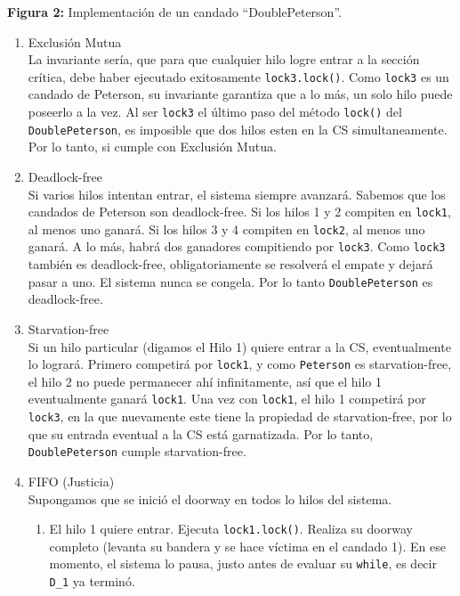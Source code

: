     \begin{center}
        \textbf{Figura 2:} Implementación de un candado ``DoublePeterson''.
    \end{center}
\begin{enumerate}
    \item Exclusión Mutua \\
    La invariante sería, que para que cualquier hilo logre entrar a la sección crítica, debe haber ejecutado exitosamente \texttt{lock3.lock()}. Como \texttt{lock3} es un candado de Peterson, su invariante garantiza que a lo más, un solo hilo puede poseerlo a la vez. Al ser \texttt{lock3} el último paso del método \texttt{lock()} del \texttt{DoublePeterson}, es imposible que dos hilos esten en la CS simultaneamente. Por lo tanto, si cumple con Exclusión Mutua.
    \item Deadlock-free \\
    Si varios hilos intentan entrar, el sistema siempre avanzará. Sabemos que los candados de Peterson son deadlock-free. Si los hilos 1 y 2 compiten en \texttt{lock1}, al menos uno ganará. Si los hilos 3 y 4 compiten en \texttt{lock2}, al menos uno ganará. A lo más, habrá dos ganadores compitiendo por \texttt{lock3}. Como \texttt{lock3} también es deadlock-free, obligatoriamente se resolverá el empate y dejará pasar a uno. El sistema nunca se congela. Por lo tanto \texttt{DoublePeterson} es deadlock-free.
    \item Starvation-free \\
    Si un hilo particular (digamos el Hilo 1) quiere entrar a la CS, eventualmente lo logrará. Primero competirá por \texttt{lock1}, y como \texttt{Peterson} es starvation-free, el hilo 2 no puede permanecer ahí infinitamente, así que el hilo 1 eventualmente ganará \texttt{lock1}. Una vez con \texttt{lock1}, el hilo 1 competirá por \texttt{lock3}, en la que nuevamente este tiene la propiedad de starvation-free, por lo que su entrada eventual a la CS está garnatizada. Por lo tanto, \texttt{DoublePeterson} cumple starvation-free.
    \item FIFO (Justicia) \\
    Supongamos que se inició el doorway en todos lo hilos del sistema.
    \begin{enumerate}
        \item El hilo 1 quiere entrar. Ejecuta \texttt{lock1.lock()}. Realiza su doorway completo (levanta su bandera y se hace víctima en el candado 1). En ese momento, el sistema lo pausa, justo antes de evaluar su \texttt{while}, es decir \texttt{D_1} ya terminó.

\end{enumerate}
\end{enumerate}
